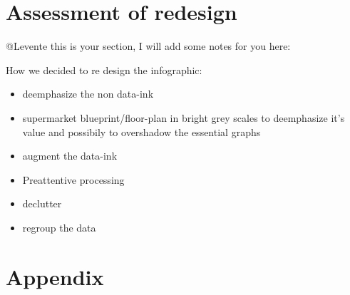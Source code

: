 \documentclass[a4paper, 11pt]{scrartcl}
\begin{document}







\section{Assessment of redesign}

@Levente this is your section, I will add some notes for you here:

How we decided to re design the infographic:

\begin{itemize}
	\item deemphasize the non data-ink
	\item supermarket blueprint/floor-plan in bright grey scales to deemphasize
		it's value and possibily to overshadow the essential graphs
	\item augment the data-ink
  \item Preattentive processing
	\item declutter
	\item regroup the data
\end{itemize}





\newpage
\clearpage
\section{Appendix}
\end{document}
